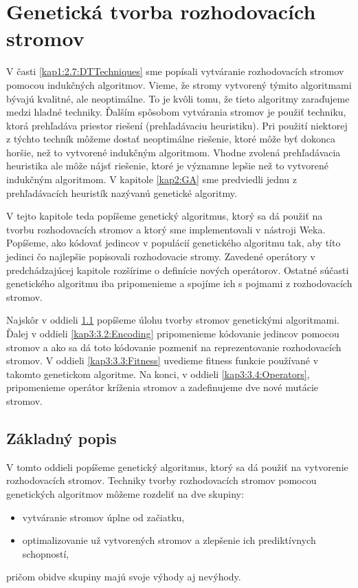 \chapter{Genetická tvorba rozhodovacích stromov}\label{kap3:GA}
V časti \ref{kap1:2.7:DTTechniques} sme popísali vytváranie rozhodovacích stromov pomocou indukčných algoritmov. Vieme, že stromy vytvorený týmito algoritmami bývajú kvalitné, ale neoptimálne. To je kvôli tomu, že tieto algoritmy zaraďujeme medzi hladné techniky. Ďalším spôsobom vytvárania stromov je použiť techniku, ktorá prehľadáva priestor riešení (prehľadávaciu heuristiku). Pri použití niektorej z týchto techník môžeme dostať neoptimálne riešenie, ktoré môže byť dokonca horšie, než to vytvorené indukčným algoritmom. Vhodne zvolená prehľadávacia heuristika ale môže nájsť riešenie, ktoré je významne lepšie než to vytvorené indukčným algoritmom. V kapitole \ref{kap2:GA} sme predviedli jednu z prehľadávacích heuristík nazývanú genetické algoritmy.

V tejto kapitole teda popíšeme genetický algoritmus, ktorý sa dá použiť na tvorbu rozhodovacích stromov a ktorý sme implementovali v nástroji Weka. Popíšeme, ako kódovať jedincov v populácií genetického algoritmu tak, aby títo jedinci čo najlepšie popisovali rozhodovacie stromy. Zavedené operátory v predchádzajúcej kapitole rozšírime o definície nových operátorov. Ostatné súčasti genetického algoritmu iba pripomenieme a spojíme ich s pojmami z rozhodovacích stromov.

Najskôr v oddieli \ref{kap3:3.1:Intro} popíšeme úlohu tvorby stromov genetickými algoritmami. Ďalej v oddieli \ref{kap3:3.2:Encoding} pripomenieme kódovanie jedincov pomocou stromov a ako sa dá toto kódovanie pozmeniť na reprezentovanie rozhodovacích stromov. V oddieli \ref{kap3:3.3:Fitness} uvedieme fitness funkcie používané v takomto genetickom algoritme. Na konci, v oddieli \ref{kap3:3.4:Operators}, pripomenieme operátor kríženia stromov a zadefinujeme dve nové mutácie stromov.
\section{Základný popis}\label{kap3:3.1:Intro}
V tomto oddieli popíšeme genetický algoritmus, ktorý sa dá použiť na vytvorenie rozhodovacích stromov. Techniky tvorby rozhodovacích stromov pomocou genetických algoritmov môžeme rozdeliť na dve skupiny:
\begin{itemize}
\item vytváranie stromov úplne od začiatku,
\item optimalizovanie už vytvorených stromov a zlepšenie ich prediktívnych schopností,
\end{itemize}
pričom obidve skupiny majú svoje výhody aj nevýhody.

